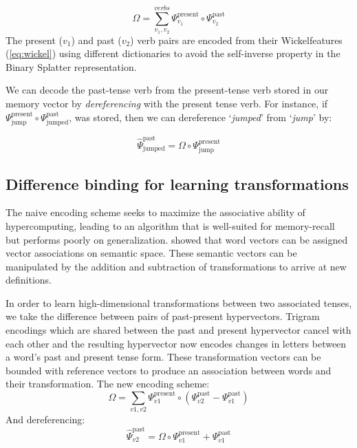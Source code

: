 \documentclass{article}
\begin{document}
\begin{equation}
\Omega = \sum_{v_1, v_2}^{verbs} \Psi^{\text{present}}_{v_1} \circ \Psi^{\text{past}}_{v_2}
\end{equation}
The present ($v_1$) and past ($v_2$) verb pairs are encoded from their Wickelfeatures (\ref{eq:wickel}) using different dictionaries to avoid the self-inverse property in the Binary Splatter representation. 

We can decode the past-tense verb from the present-tense verb stored in our memory vector by \emph{dereferencing} with the present tense verb. For instance, if $\Psi_{\text{jump}}^{\text{present}} \circ \Psi_{\text{jumped}}^{\text{past}}$, was stored, then we can dereference `\emph{jumped}' from `\emph{jump}' by:

\begin{equation}
\hat{\Psi}_{\text{jumped}}^{\text{past}} = \Omega \circ \Psi_{\text{jump}}^{\text{present}}
\end{equation}

\subsection{Difference binding for learning transformations}
The naive encoding scheme seeks to maximize the associative ability of hypercomputing, leading to an algorithm that is well-suited for memory-recall but performs poorly on generalization. \citet{Mikolov2013} showed that word vectors can be assigned vector associations on semantic space. These semantic vectors can be manipulated by the addition and subtraction of transformations to arrive at new definitions.

In order to learn high-dimensional transformations between two associated tenses, we take the difference between pairs of past-present hypervectors. Trigram encodings which are shared between the past and present hypervector cancel with each other and the resulting hypervector now encodes changes in letters between a word's past and present tense form. These transformation vectors can be bounded with reference vectors to produce an association between words and their transformation. The new encoding scheme:
 \begin{equation}
 \label{eq:diff_wickel_ref}
 \Omega =  \sum_{v1, v2} \Psi^{\text{present}}_{v1} \circ (\Psi^{\text{past}}_{v2} - \Psi^{\text{past}}_{v1})
 \end{equation}
 And dereferencing:
 \begin{equation}
 \label{eq:diff_wickel_deref}
 \hat{\Psi}^{\text{past}}_{v2} = \Omega \circ \Psi^{\text{present}}_{v1} + \Psi^{\text{past}}_{v1}
 \end{equation}
 
\end{document}
